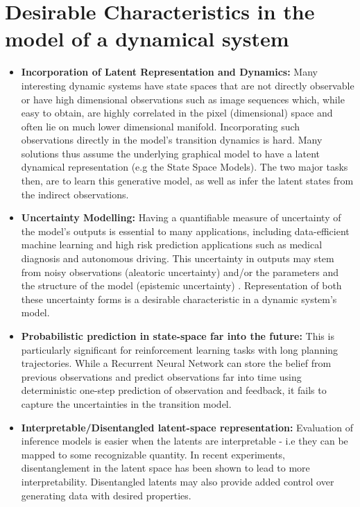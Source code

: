 \documentclass[10pt,twocolumn,letterpaper]{article}
\begin{document}
	\section{Desirable Characteristics in the model of a dynamical system}
	\begin{itemize}
		\item \textbf{Incorporation of Latent Representation and Dynamics:} Many interesting dynamic systems have state spaces that are not directly observable or have high dimensional observations such as image sequences which, while easy to obtain, are highly correlated in the pixel (dimensional) space and often lie on much lower dimensional manifold. Incorporating such observations directly in the model's transition dynamics is hard. Many solutions \cite{karl2016deep, krishnan2015deep} thus assume the underlying graphical model to have a latent dynamical representation (e.g the State Space Models). The two major tasks then, are to learn this generative model, as well as infer the latent states from the indirect observations.
		\item \textbf{Uncertainty Modelling:} Having a quantifiable measure of uncertainty of the model's outputs is essential to many applications, including data-efficient machine learning and high risk prediction applications such as medical diagnosis and autonomous driving. This uncertainty in outputs may stem from noisy observations (aleatoric uncertainty) and/or the parameters and the structure of the model (epistemic uncertainty) \cite{gal2016uncertainty}. Representation of both these uncertainty forms is a desirable characteristic in a dynamic system's model.
		\item \textbf{Probabilistic prediction in state-space far into the future:} This is particularly significant for reinforcement learning tasks with long planning trajectories. While a Recurrent Neural Network can store the belief from previous observations and predict observations far into time using deterministic one-step prediction of observation and feedback, it fails to capture the uncertainties in the transition model.
		\item \textbf{Interpretable/Disentangled latent-space representation:} Evaluation of inference models is easier when the latents are interpretable - i.e they can be mapped to some recognizable quantity. In recent experiments, disentanglement in the latent space has been shown to lead to more interpretability\cite{higgins2017beta, kim2018disentangling}. Disentangled latents may also provide added control over generating data with desired properties\cite{yingzhen2018disentangled}.

\end{itemize}
\end{document}
